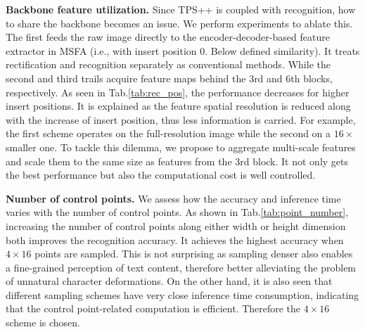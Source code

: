 \documentclass{article}
\begin{document}
\noindent\textbf{Backbone feature utilization.}
Since TPS++ is coupled with recognition, how to share the backbone becomes an issue. We perform experiments to ablate this. The first feeds the raw image directly to the encoder-decoder-based feature extractor in MSFA (i.e., with insert position 0. Below defined similarity). It treats rectification and recognition separately as conventional methods. While the second and third trails acquire feature maps behind the 3rd and 6th blocks, respectively. As seen in Tab.\ref{tab:rec_pos}, the performance decreases for higher insert positions. It is explained as the feature spatial resolution is reduced along with the increase of insert position, thus less information is carried. For example, the first scheme operates on the full-resolution image while the second on a $16\times$ smaller one. To tackle this dilemma, we propose to aggregate multi-scale features and scale them to the same size as features from the 3rd block. It not only gets the best performance but also the computational cost is well controlled.

\begin{table}[t]
\caption{Ablation study on backbone feature utilization.}
\label{tab:rec_pos}
\end{table}


\noindent\textbf{Number of control points.} 
We assess how the accuracy and inference time varies with the number of control points. As shown in Tab.\ref{tab:point_number}, increasing the number of control points along either width or height dimension both improves the recognition accuracy. It achieves the highest accuracy when $4\times16$ points are sampled. This is not surprising as sampling denser also enables a fine-grained perception of text content, therefore better alleviating the problem of unnatural character deformations. On the other hand, it is also seen that different sampling schemes have very close inference time consumption, indicating that the control point-related computation is efficient. Therefore the $4\times16$ scheme is chosen. 
\end{document}
